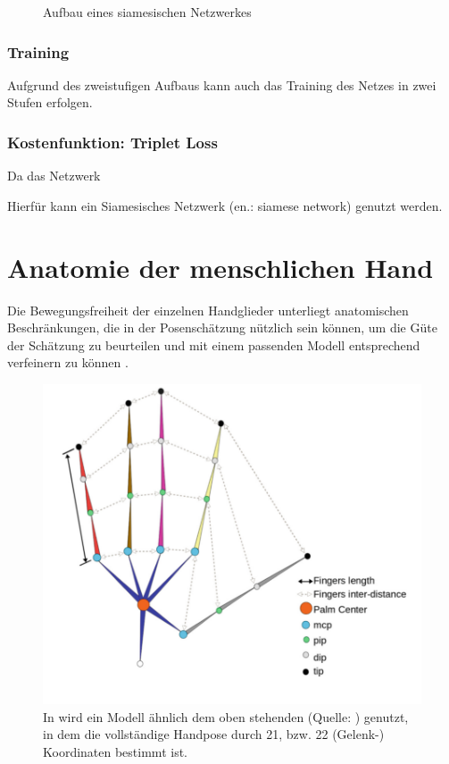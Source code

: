 	 
	 
	 \begin{figure}
	 	\centering
	 	
	 	\caption{Aufbau eines siamesischen Netzwerkes}
	 	\label{fig:siamesenetwork}
	 \end{figure}
	 
	 
	 \subsubsection{Training}
	 Aufgrund des zweistufigen Aufbaus kann auch das Training des Netzes in zwei Stufen erfolgen.
	 
	 \subsubsection{Kostenfunktion: Triplet Loss}
	 Da das Netzwerk 
	 

	
	Hierfür kann ein Siamesisches Netzwerk (en.: siamese network) genutzt werden. 
	
\section { Anatomie der menschlichen Hand }
	Die Bewegungsfreiheit der einzelnen Handglieder unterliegt anatomischen Beschränkungen, die in der Posenschätzung nützlich sein können, um die Güte der Schätzung zu beurteilen und mit einem passenden Modell entsprechend verfeinern zu können \cite{Melax5222017}.
	
	\begin{figure}
		\centering
		\includegraphics[width=0.7\linewidth]{Ressourcen/malik2018_hand_model}
		\caption[Handmodell nach \cite{Malik2018b}]{In \cite{Malik2018b} wird ein Modell ähnlich dem oben stehenden (Quelle: \cite{Malik2018b}) genutzt, in dem die vollständige Handpose durch 21, bzw. 22 (Gelenk-) Koordinaten bestimmt ist.}
		\label{fig:malik2018handmodel}
	\end{figure}
	
